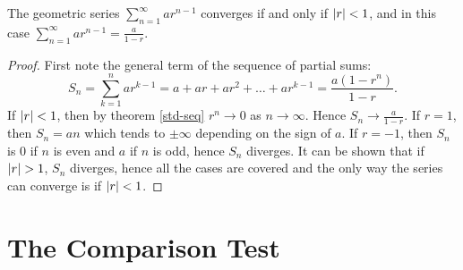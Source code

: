 \documentclass[../real_analysis.tex]{subfiles}
\begin{document}
        \begin{theorem}\label{geometric-series}
            The geometric series $\sum_{n=1}^\infty ar^{n-1}$ converges if and only if $\lvert r\rvert<1$, and in this case $\sum_{n=1}^\infty ar^{n-1}=\frac{a}{1-r}$.
        \end{theorem}
        \begin{proof}
            First note the general term of the sequence of partial sums:
            \begin{equation*}
                S_n=\sum_{k=1}^n ar^{k-1}=a+ar+ar^2+\dots+ar^{k-1}=\frac{a(1-r^n)}{1-r}\tag{$r\neq1$}. %
            \end{equation*}
            If $\lvert r\rvert<1$, then by theorem \ref{std-seq} $r^n\to0$ as $n\to\infty$. Hence $S_n\to\frac{a}{1-r}$. If $r=1$, then $S_n=an$ which tends to $\pm\infty$ depending on the sign of $a$. If $r=-1$, then $S_n$ is 0 if $n$ is even and $a$ if $n$ is odd, hence $S_n$ diverges. It can be shown that if $\lvert r\rvert>1$, $S_n$ diverges, hence all the cases are covered and the only way the series can converge is if $\lvert r\rvert<1$.
        \end{proof}

    \section{The Comparison Test}
\end{document}
